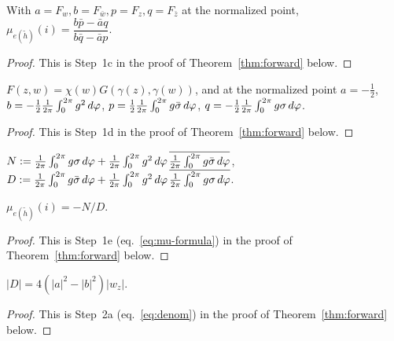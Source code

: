 \begin{lemma}\label{lem:dilatation_implicit_ratio}
	With $a=F_w,b=F_{\bar w},p=F_z,q=F_{\bar z}$ at the normalized point, $\mu_{e(\tilde h)}(i)=\dfrac{b\bar p-\bar aq}{b\bar q-\bar ap}$.
\end{lemma}
\begin{proof}
	This is Step~1c in the proof of Theorem~\ref{thm:forward} below.
\end{proof}

\begin{lemma}[Step 1d: $F=\chi\cdot G\circ\gamma$ and the four coefficients]\label{lem:baryFn_coefficients}
	$F(z,w)=\chi(w)G(\gamma(z),\gamma(w))$, and at the normalized point $a=-\tfrac12$, $b=-\tfrac12\frac{1}{2\pi}\int_0^{2\pi} g^2 \,d\varphi$, $p=\tfrac12\frac{1}{2\pi}\int_0^{2\pi} g\bar\sigma \,d\varphi$, $q=-\tfrac12\frac{1}{2\pi}\int_0^{2\pi} g\sigma \,d\varphi$.
\end{lemma}
\begin{proof}
	This is Step~1d in the proof of Theorem~\ref{thm:forward} below.
\end{proof}

\begin{definition}\label{def:muNumerator}
	$N:=\frac{1}{2\pi}\int_0^{2\pi} g\sigma \,d\varphi+\frac{1}{2\pi}\int_0^{2\pi} g^2 \,d\varphi\,\overline{\frac{1}{2\pi}\int_0^{2\pi} g\bar\sigma \,d\varphi}$, $D:=\frac{1}{2\pi}\int_0^{2\pi} g\bar\sigma \,d\varphi+\frac{1}{2\pi}\int_0^{2\pi} g^2 \,d\varphi\,\overline{\frac{1}{2\pi}\int_0^{2\pi} g\sigma \,d\varphi}$.
\end{definition}

\begin{lemma}\label{lem:dilatation_closed_formula}
	$\mu_{e(\tilde h)}(i)=-N/D$.
\end{lemma}
\begin{proof}
	This is Step~1e (eq.~\eqref{eq:mu-formula}) in the proof of Theorem~\ref{thm:forward} below.
\end{proof}

\begin{lemma}\label{lem:muDenominator_eq_jacobian}
	$|D|=4(|a|^2-|b|^2)|w_z|$.
\end{lemma}
\begin{proof}
	This is Step~2a (eq.~\eqref{eq:denom}) in the proof of Theorem~\ref{thm:forward} below.
\end{proof}

